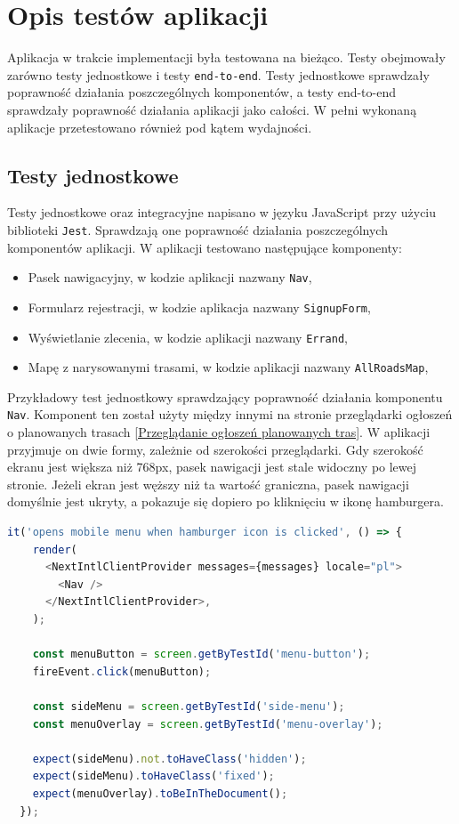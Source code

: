 \section{Opis testów aplikacji}
Aplikacja w trakcie implementacji była testowana na bieżąco. Testy obejmowały zarówno testy jednostkowe i testy \texttt{end-to-end}. Testy jednostkowe sprawdzały poprawność działania poszczególnych komponentów, a testy end-to-end sprawdzały poprawność działania aplikacji jako całości. W pełni wykonaną aplikacje przetestowano również pod kątem wydajności.

\subsection{Testy jednostkowe}
Testy jednostkowe oraz integracyjne napisano w języku JavaScript przy użyciu biblioteki \texttt{Jest}. Sprawdzają one poprawność działania poszczególnych komponentów aplikacji. W aplikacji testowano następujące komponenty:
\begin{itemize}
  \item Pasek nawigacyjny, w kodzie aplikacji nazwany \texttt{Nav},
  \item Formularz rejestracji, w kodzie aplikacja nazwany \texttt{SignupForm},
  \item Wyświetlanie zlecenia, w kodzie aplikacji nazwany \texttt{Errand},
  \item Mapę z narysowanymi trasami, w kodzie aplikacji nazwany \texttt{AllRoadsMap},
\end{itemize}

Przykładowy test jednostkowy sprawdzający poprawność działania komponentu \texttt{Nav}. Komponent ten został użyty między innymi na stronie przeglądarki ogłoszeń o planowanych trasach \ref{Przeglądanie ogłoszeń planowanych tras}. W aplikacji przyjmuje on dwie formy, zależnie od szerokości przeglądarki. Gdy szerokość ekranu jest większa niż 768px, pasek nawigacji jest stale widoczny po lewej stronie. Jeżeli ekran jest węższy niż ta wartość graniczna, pasek nawigacji domyślnie jest ukryty, a pokazuje się dopiero po kliknięciu w ikonę hamburgera.

\pagebreak
{\belowcaptionskip=-9pt
\begin{lstlisting}[language=JavaScript,caption=Przykładowy test jednostkowy paska nawigacyjnego, label=lst:NavTest]
it('opens mobile menu when hamburger icon is clicked', () => {
    render(
      <NextIntlClientProvider messages={messages} locale="pl">
        <Nav />
      </NextIntlClientProvider>,
    );

    const menuButton = screen.getByTestId('menu-button');
    fireEvent.click(menuButton);

    const sideMenu = screen.getByTestId('side-menu');
    const menuOverlay = screen.getByTestId('menu-overlay');

    expect(sideMenu).not.toHaveClass('hidden');
    expect(sideMenu).toHaveClass('fixed');
    expect(menuOverlay).toBeInTheDocument();
  });
\end{lstlisting}
}

